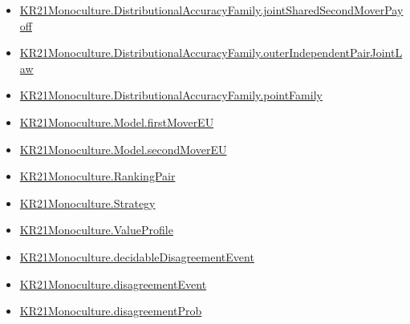 \documentclass[10pt]{article}
\begin{document}
\begin{itemize}
\item \hyperlink{governing-declaration-47f2c4e732fcdf23}{KR21\allowbreak{}Monoculture.\allowbreak{}Distributional\allowbreak{}Accuracy\allowbreak{}Family.\allowbreak{}joint\allowbreak{}Shared\allowbreak{}Second\allowbreak{}Mover\allowbreak{}Payoff}
\item \hyperlink{governing-declaration-e6c9a24a5d927c25}{KR21\allowbreak{}Monoculture.\allowbreak{}Distributional\allowbreak{}Accuracy\allowbreak{}Family.\allowbreak{}outer\allowbreak{}Independent\allowbreak{}Pair\allowbreak{}Joint\allowbreak{}Law}
\item \hyperlink{governing-declaration-6c17a1f578028c9d}{KR21\allowbreak{}Monoculture.\allowbreak{}Distributional\allowbreak{}Accuracy\allowbreak{}Family.\allowbreak{}point\allowbreak{}Family}
\item \hyperlink{governing-declaration-c7e343ac9b4d37a5}{KR21\allowbreak{}Monoculture.\allowbreak{}Model.\allowbreak{}first\allowbreak{}Mover\allowbreak{}EU}
\item \hyperlink{governing-declaration-e4f79c4b5e166782}{KR21\allowbreak{}Monoculture.\allowbreak{}Model.\allowbreak{}second\allowbreak{}Mover\allowbreak{}EU}
\item \hyperlink{governing-declaration-90a7e19d973f51cb}{KR21\allowbreak{}Monoculture.\allowbreak{}Ranking\allowbreak{}Pair}
\item \hyperlink{paper-prerequisite-b00425a844bd2ddf}{KR21\allowbreak{}Monoculture.\allowbreak{}Strategy}
\item \hyperlink{paper-prerequisite-c0e41e9b0e843969}{KR21\allowbreak{}Monoculture.\allowbreak{}Value\allowbreak{}Profile}
\item \hyperlink{governing-declaration-5cbdecfd9d92e1c7}{KR21\allowbreak{}Monoculture.\allowbreak{}decidable\allowbreak{}Disagreement\allowbreak{}Event}
\item \hyperlink{governing-declaration-2d73a8643b1237e4}{KR21\allowbreak{}Monoculture.\allowbreak{}disagreement\allowbreak{}Event}
\item \hyperlink{governing-declaration-1058967a4165ec09}{KR21\allowbreak{}Monoculture.\allowbreak{}disagreement\allowbreak{}Prob}
\end{itemize}
\end{document}
